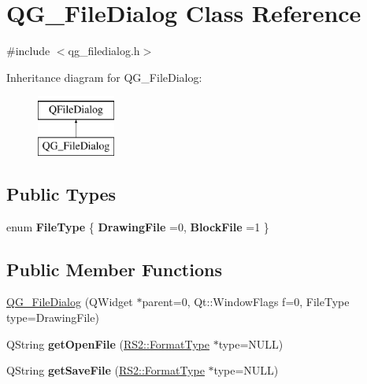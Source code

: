 \hypertarget{classQG__FileDialog}{\section{Q\-G\-\_\-\-File\-Dialog Class Reference}
\label{classQG__FileDialog}
}


{\ttfamily \#include $<$qg\-\_\-filedialog.\-h$>$}

Inheritance diagram for Q\-G\-\_\-\-File\-Dialog\-:\begin{figure}[H]
\begin{center}
\leavevmode
\includegraphics[height=2.000000cm]{classQG__FileDialog}
\end{center}
\end{figure}
\subsection*{Public Types}
\begin{DoxyCompactItemize}
\item 
enum {\bfseries File\-Type} \{ {\bfseries Drawing\-File} =0, 
{\bfseries Block\-File} =1
 \}
\end{DoxyCompactItemize}
\subsection*{Public Member Functions}
\begin{DoxyCompactItemize}
\item 
\hyperlink{classQG__FileDialog_ac7f6faf8c61d4c03ebfab0252ee73649}{Q\-G\-\_\-\-File\-Dialog} (Q\-Widget $\ast$parent=0, Qt\-::\-Window\-Flags f=0, File\-Type type=Drawing\-File)
\item 
\hypertarget{classQG__FileDialog_a3323ae1b1b8e28c60e2e8612dee0447d}{Q\-String {\bfseries get\-Open\-File} (\hyperlink{classRS2_a077a6c94c9a0ab9962c4d4a612c7189b}{R\-S2\-::\-Format\-Type} $\ast$type=N\-U\-L\-L)}\label{classQG__FileDialog_a3323ae1b1b8e28c60e2e8612dee0447d}

\item 
\hypertarget{classQG__FileDialog_aa153457ccb066283a9ed431248981339}{Q\-String {\bfseries get\-Save\-File} (\hyperlink{classRS2_a077a6c94c9a0ab9962c4d4a612c7189b}{R\-S2\-::\-Format\-Type} $\ast$type=N\-U\-L\-L)}\label{classQG__FileDialog_aa153457ccb066283a9ed431248981339}

\end{DoxyCompactItemize}
